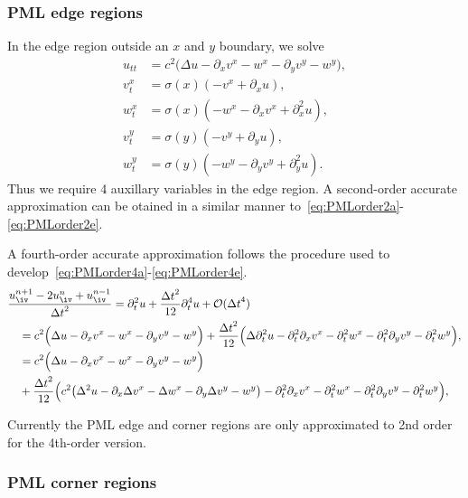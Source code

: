 \documentclass{article}
\begin{document}
\subsubsection{PML edge regions} \label{sec:PMLedge}
In the edge region outside an $x$ and $y$ boundary, we solve 
\begin{align}
  u_{tt} &= c^2 \Big( \Delta u - \partial_x v^x - w^x - \partial_y v^y - w^y \Big), \\
   v^x_t &= \sigma(x)( -v^x + \partial_x u ) , \\
   w^x_t &= \sigma(x) ( -w^x  - \partial_x v^x + \partial_x^2 u ), \\
   v^y_t &= \sigma(y)( -v^y + \partial_y u ) , \\
   w^y_t &= \sigma(y) ( -w^y  - \partial_y v^y + \partial_y^2 u ). 
\end{align}
Thus we require 4 auxillary variables in the edge region. 
A second-order accurate approximation can be otained in a similar manner to~\eqref{eq:PMLorder2a}-\eqref{eq:PMLorder2e}.

A fourth-order accurate approximation follows the procedure used to develop~\eqref{eq:PMLorder4a}-\eqref{eq:PMLorder4e}. 
\begin{align}
 & {u_\iv^{n+1} - 2 u_\iv^n + u_\iv^{n-1} \over \dt^2} = \partial_t^2 u + \frac{\dt^2}{12} \partial_t^4 u + \Oc(\dt^4)  \\
   &\quad = c^2 \Big( \Delta u - \partial_x v^x - w^x - \partial_y v^y - w^y \Big)
    + \frac{\dt^2}{12}\Big( \Delta \partial_t^2 u 
                    - \partial_t^2\partial_x v^x - \partial_t^2w^x - \partial_t^2\partial_y v^y - \partial_t^2w^y \Big), \\
   &\quad= c^2 \Big( \Delta u - \partial_x v^x - w^x - \partial_y v^y - w^y\Big) \\
   &\quad + \frac{\dt^2}{12}\Big( c^2 \big( \Delta^2 u - \partial_x\Delta  v^x - \Delta w^x - \partial_y\Delta  v^y - w^y\big)  
                - \partial_t^2\partial_x v^x - \partial_t^2w^x - \partial_t^2\partial_y v^y - \partial_t^2w^y \Big), 
\end{align}


 Currently the PML edge and corner regions are only approximated to 2nd order for the 4th-order version.

\subsubsection{PML corner regions} \label{sec:PMLcorner}
\end{document}
